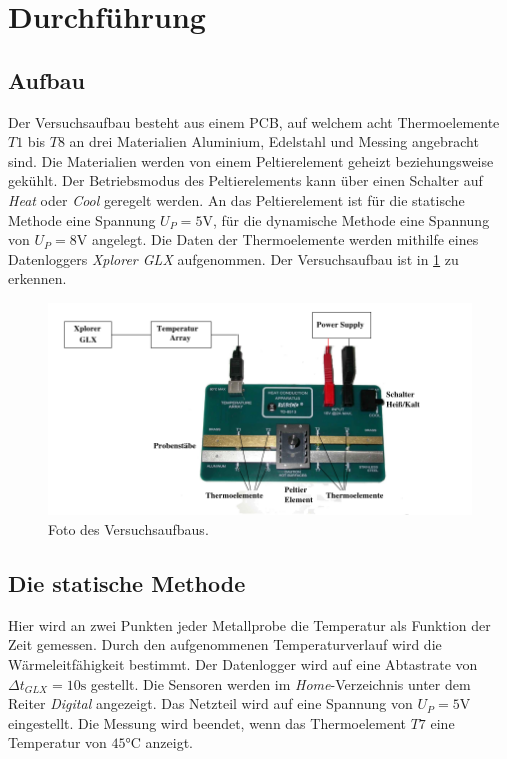 \section{Durchführung}
\label{sec:durchführung}

\subsection{Aufbau}
\label{sec:aufbau}
Der Versuchsaufbau besteht aus einem PCB, auf welchem acht Thermoelemente $T1$ bis
$T8$ an drei Materialien Aluminium, Edelstahl und Messing angebracht sind. Die
Materialien werden von einem Peltierelement geheizt beziehungsweise gekühlt.
Der Betriebsmodus des Peltierelements kann über einen Schalter auf \textit{Heat}
oder \textit{Cool} geregelt werden. An das Peltierelement ist für die statische
Methode eine Spannung $U_P = 5 \si{\volt}$, für die dynamische Methode eine
Spannung von $U_P = 8 \si{\volt}$ angelegt. Die Daten der Thermoelemente werden
mithilfe eines Datenloggers \textit{Xplorer GLX} aufgenommen.
Der Versuchsaufbau ist in \ref{fig:aufbau} zu erkennen.

\begin{figure}[H]
  \centering
  \includegraphics[scale=0.5]{content/pcb.png}
  \caption{Foto des Versuchsaufbaus.\cite{AP01}}
  \label{fig:aufbau}
\end{figure}

\subsection{Die statische Methode}
\label{sec:statisch}
Hier wird an zwei Punkten jeder Metallprobe die Temperatur als Funktion der Zeit
gemessen. Durch den aufgenommenen Temperaturverlauf wird die Wärmeleitfähigkeit bestimmt.
Der Datenlogger wird auf eine Abtastrate von $\Delta t_{GLX} = 10 \si{\second}$
gestellt. Die Sensoren werden im \textit{Home}-Verzeichnis unter dem Reiter \textit{Digital}
angezeigt. Das Netzteil wird auf eine Spannung von $U_P = 5 \si{\volt}$ eingestellt.
Die Messung wird beendet, wenn das Thermoelement $T7$ eine Temperatur von $45 \si{\celsius}$
anzeigt.

